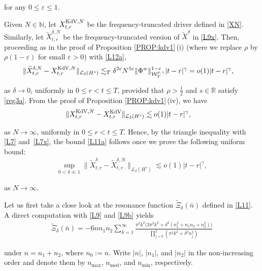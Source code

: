 \documentclass[letterpaper, 11pt,  reqno]{amsart}
\DeclareMathOperator{\med}{med}
\newcommand{\1}{\hspace{0.5mm}\text{I}\hspace{0.5mm}}
\newcommand{\noi}{\noindent}
\newcommand{\R}{\mathbb{R}}
\newcommand{\dl}{\delta}
\newcommand{\eps}{\varepsilon}
\newcommand{\g}{\gamma}
\newcommand{\wt}{\widetilde}
\newcommand{\les}{\lesssim}
\newcommand{\N}{\mathbb{N}}
\newcommand{\cL}{\mathcal{L}}
\newcommand{\W}{\mathcal{W}}
\newcommand{\KDV}{\text{\rm KdV} }
\numberwithin{equation}{section}
\numberwithin{theorem}{section}
\begin{document}
\noi
for any $0 \le \eps \le 1$.




Given $N \in \N$, 
let $X^{\KDV,N}_{t,r} $
be  the frequency-truncated driver
defined in \eqref{XN}.
Similarly, 
let $\wt X^{\dl,N}_{t,r} $ 
be 
 the frequency-truncated version of $\wt X^\dl$  in \eqref{L9x}.
Then, proceeding as in the proof of Proposition \ref{PROP:kdv1}\,(i)
(where we replace $\rho$ by $\rho(1-\eps)$
for small $\eps > 0$)
with \eqref{L12a}, 
\begin{align}
\|   \wt X^{\dl,N}_{t,r} -X^{\KDV,N}_{t,r}\|_{\cL_2({H^s})} 
&
\les_{T}
\dl^ {2\eps} 
 N^{5\eps}
\|\Phi^w\|_{  \W^{\rho,\g}_T}^{1-\eps}
 |t-r|^\g = o(1) |t-r|^\g, 
\label{L7}
\end{align}

\noi
as $\dl \to 0$, 
uniformly in  $0 \le r <  t \le T$, 
provided that  $\rho > \frac 12$ and $s \in \R$
satisfy 
\eqref{reg3a}.
From the proof of 
Proposition \ref{PROP:kdv1}\,(iv), we  have 
\begin{align}
\|X^{\KDV, N}_{t,r} -X^\KDV_{t,r}\|_{\cL_2 (H^s)} 
&
\les
 o(1) |t-r|^\g, 
\label{L7x}
\end{align}

\noi
as $N \to \infty$, 
uniformly in  $0 \le r <  t \le T$.
Hence, by the triangle inequality with \eqref{L7}
and~\eqref{L7x}, 
the bound \eqref{L11a}
follows once we prove the following uniform bound:
\begin{align}
\sup_{0 < \dl \ll 1} \|  \wt X^\dl_{t,r} - \wt X^{\dl,N}_{t,r} \|_{\cL_2 (H^s)}
\les
 o(1) |t-r|^\g, 
\label{L7y}
\end{align}


\noi
as $N \to \infty$.



Let us first take a close look at the resonance function 
$\wt \Xi_\dl(\bar n)$ defined in \eqref{L11}.
A direct computation  with \eqref{L9} and \eqref{L9b}
yields
\begin{align}
\wt \Xi_\dl(\bar n)
= -6n n_1 n_2
 \sum_{k=1}^{\infty}   
 \frac{ \pi^2 k^2 \big(3 \pi^2 k^2 + \dl^2(n_1^2 + n_1 n_2 + n_2^2)\big)}
 {\prod_{j = 0}^2(\pi^2 k^2 +\dl^2n_j^2)}
\label{LL1}
\end{align}

\noi
under  $n = n_1 + n_2$, where $n_0 := n$.
Write  $|n|$, $|n_1|$, and $|n_2|$
in the non-increasing order and denote them by 
 $n_{\max}$, 
$n_{\med}$, and $n_{\min}$, respectively.



\medskip
\end{document}
